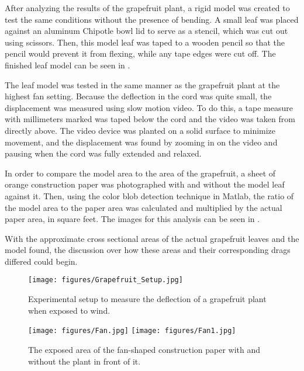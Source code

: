 After analyzing the results of the grapefruit plant, a rigid model was created to test the same conditions without the presence of bending. A small leaf was placed against an aluminum Chipotle bowl lid to serve as a stencil, which was cut out using scissors. Then, this model leaf was taped to a wooden pencil so that the pencil would prevent it from flexing, while any tape edges were cut off. The finished leaf model can be seen in 
.

The leaf model was tested in the same manner as the grapefruit plant at the highest fan setting. Because the deflection in the cord was quite small, the displacement was measured using slow motion video. To do this, a tape measure with millimeters marked was taped below the cord and the video was taken from directly above. The video device was planted on a solid surface to minimize movement, and the displacement was found by zooming in on the video and pausing when the cord was fully extended and relaxed. 

In order to compare the model area to the area of the grapefruit, a sheet of orange construction paper was photographed with and without the model leaf against it. Then, using the color blob detection technique in Matlab, the ratio of the model area to the paper area was calculated and multiplied by the actual paper area, in square feet. The images for this analysis can be seen in .

With the approximate cross sectional areas of the actual grapefruit leaves and the model found, the discussion over how these areas and their corresponding drags differed could begin.


\begin{figure}
\begin{center}
\texttt{[image: figures/Grapefruit\_Setup.jpg]} 
\end{center}
\caption{Experimental setup to measure the deflection of a grapefruit plant when exposed to wind.}
\label{fig:methods1}
\end{figure}

\begin{figure}
\begin{center}
\texttt{[image: figures/Fan.jpg]}
\texttt{[image: figures/Fan1.jpg]}
\end{center}
\caption{The exposed area of the fan-shaped construction paper with and without the plant in front of it.}
\label{fig:methods2}
\end{figure}

